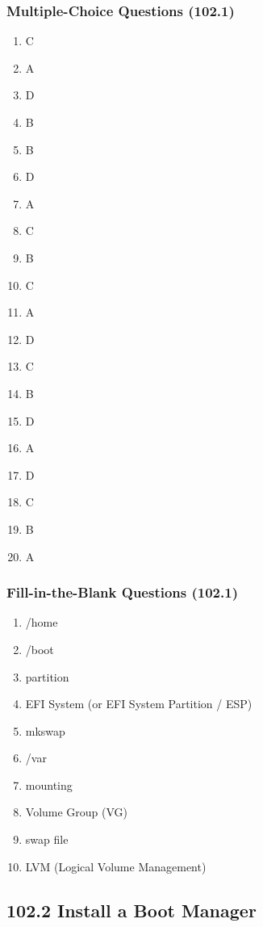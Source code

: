 \documentclass[a4paper]{report}
\begin{document}
\subsubsection*{Multiple-Choice Questions (102.1)}
\begin{enumerate}[1.]
    \item C
    \item A
    \item D
    \item B
    \item B
    \item D
    \item A
    \item C
    \item B
    \item C
    \item A
    \item D
    \item C
    \item B
    \item D
    \item A
    \item D
    \item C
    \item B
    \item A
\end{enumerate}


\subsubsection*{Fill-in-the-Blank Questions (102.1)}
\begin{enumerate}[1.]
    \item /home
    \item /boot
    \item partition
    \item EFI System (or EFI System Partition / ESP)
    \item mkswap
    \item /var
    \item mounting
    \item Volume Group (VG)
    \item swap file
    \item LVM (Logical Volume Management)
\end{enumerate}

\subsection*{102.2 Install a Boot Manager}
\end{document}
